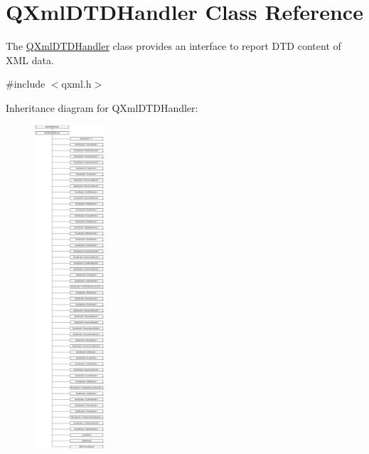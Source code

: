 \hypertarget{class_q_xml_d_t_d_handler}{}\section{Q\+Xml\+D\+T\+D\+Handler Class Reference}
\label{class_q_xml_d_t_d_handler}


The \mbox{\hyperlink{class_q_xml_d_t_d_handler}{Q\+Xml\+D\+T\+D\+Handler}} class provides an interface to report D\+TD content of X\+ML data.  




{\ttfamily \#include $<$qxml.\+h$>$}

Inheritance diagram for Q\+Xml\+D\+T\+D\+Handler\+:\begin{figure}[H]
\begin{center}
\leavevmode
\includegraphics[height=12.000000cm]{class_q_xml_d_t_d_handler}
\end{center}
\end{figure}
